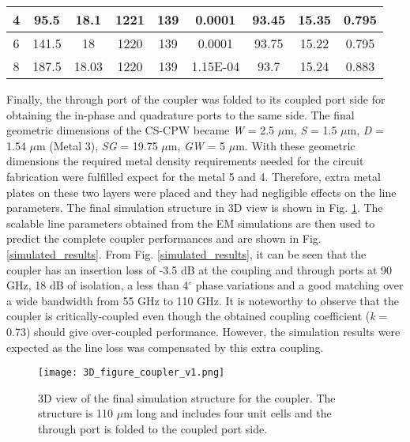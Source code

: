 \documentclass[journal]{IEEEtran}
\begin{document}
\begin{table*}[]
{\begin{tabular}{@{}|ccccccccc|@{}}
			\multicolumn{1}{|c|}{4} & \multicolumn{1}{c|}{95.5}  & \multicolumn{1}{c|}{18.1}  & \multicolumn{1}{c|}{1221}  & \multicolumn{1}{c|}{139}  & \multicolumn{1}{c|}{0.0001}   & \multicolumn{1}{c|}{93.45} & \multicolumn{1}{c|}{15.35} & 0.795   \\ \midrule
			\multicolumn{1}{|c|}{6} & \multicolumn{1}{c|}{141.5} & \multicolumn{1}{c|}{18}    & \multicolumn{1}{c|}{1220}  & \multicolumn{1}{c|}{139}  & \multicolumn{1}{c|}{0.0001}   & \multicolumn{1}{c|}{93.75} & \multicolumn{1}{c|}{15.22} & 0.795   \\ \midrule
			\multicolumn{1}{|c|}{8} & \multicolumn{1}{c|}{187.5} & \multicolumn{1}{c|}{18.03} & \multicolumn{1}{c|}{1220}  & \multicolumn{1}{c|}{139}  & \multicolumn{1}{c|}{1.15E-04} & \multicolumn{1}{c|}{93.7}  & \multicolumn{1}{c|}{15.24} & 0.883   \\ \bottomrule
		\end{tabular}%
	}

\end{table*}



Finally, the through port of the coupler was folded to its coupled port side for obtaining the in-phase and quadrature ports to the same side. The final geometric dimensions of the CS-CPW became \textit{W} = 2.5 $\mu$m, \textit{S} = 1.5 $\mu$m, \textit{D} = 1.54 $\mu$m (Metal 3), \textit{SG} = 19.75 $\mu$m, \textit{GW} = 5 $\mu$m. With these geometric dimensions the required metal density requirements needed for the circuit fabrication were fulfilled expect for the metal 5 and 4. Therefore, extra metal plates on these two layers were placed and they had negligible effects on the line parameters. The final simulation structure in 3D view is shown in Fig. \ref{3D_full}. The scalable line parameters obtained from the EM simulations are then used to predict the complete coupler performances and are shown in Fig. \ref{simulated_results}. From Fig. \ref{simulated_results}, it can be seen that the coupler has an insertion loss of -3.5 dB at the coupling and through ports at 90 GHz, 18 dB of isolation, a less than 4$^\circ$ phase variations and a good matching over a wide bandwidth from 55 GHz to 110 GHz. It is noteworthy to observe that the coupler is critically-coupled even though the obtained coupling coefficient (\textit{k} = 0.73) should give over-coupled performance. However, the simulation results were expected as the line loss was compensated by this extra coupling.   

\begin{figure}
	\texttt{[image: 3D\_figure\_coupler\_v1.png]}
	\caption{3D view of the final simulation structure for the coupler. The structure is 110 $\mu$m long and includes four unit cells and the through port is folded to the coupled port side.}
	\label{3D_full}
\end{figure}
\end{document}
